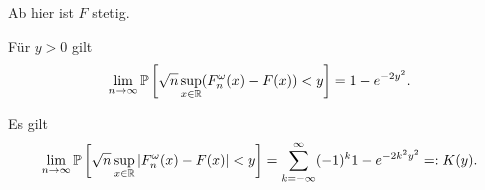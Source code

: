 Ab hier ist $F$ stetig.
\begin{thm}[Smirnow]
  Für $y > 0$ gilt
  \[\lim_{n \to \infty} \mathbb{P} \left[ \sqrt{n}
      \sup_{x \in \mathbb{R}} (F_n^\omega(x) - F(x)) < y \right]
    = 1 - e^{-2y^2}. \]
\end{thm}

\clearpage

\begin{thm}[Kolmogorow]
  Es gilt
  \[ \lim_{n \to \infty} \mathbb{P} \left[ \sqrt{n}
      \sup_{x \in \mathbb{R}} | F_n^\omega(x) - F(x) | < y \right]
    = \sum_{k = -\infty}^\infty (-1)^k 1 - e^{-2 k^2 y^2} =: K(y). \]
\end{thm}